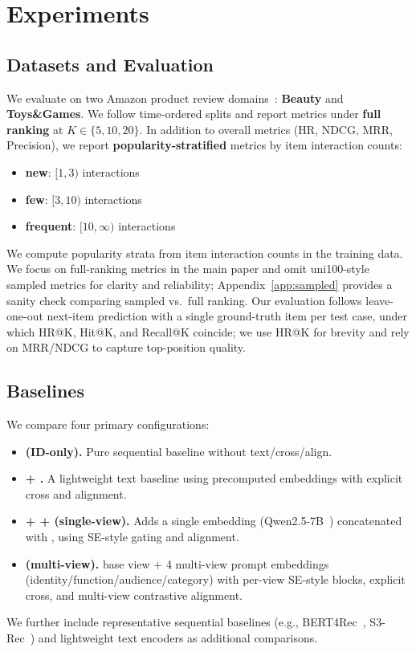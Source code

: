 \section{Experiments}
\subsection{Datasets and Evaluation}
We evaluate on two Amazon product review domains~\cite{mcauley2015amazon,ni2019amazon}: \textbf{Beauty} and
\textbf{Toys\&Games}. We follow time-ordered splits and
report metrics under \textbf{full ranking} at $K\in\{5,10,20\}$.
In addition to overall metrics (HR, NDCG, MRR, Precision),
we report \textbf{popularity-stratified} metrics by item
interaction counts:
\begin{itemize}[leftmargin=*,itemsep=1pt]
  \item \textbf{new}: $[1,3)$ interactions
  \item \textbf{few}: $[3,10)$ interactions
  \item \textbf{frequent}: $[10,\infty)$ interactions
\end{itemize}
We compute popularity strata from item interaction counts in
the training data. We focus on full-ranking metrics in the
main paper and omit uni100-style sampled metrics for clarity
and reliability; Appendix~\ref{app:sampled} provides a sanity
check comparing sampled vs.\ full ranking. Our evaluation
follows leave-one-out next-item prediction with a single
ground-truth item per test case, under which HR@K, Hit@K, and
Recall@K coincide; we use HR@K for brevity and rely on
MRR/NDCG to capture top-position quality.

\subsection{Baselines}
We compare four primary configurations:
\begin{itemize}[leftmargin=*,itemsep=2pt]
  \item \textbf{\base (ID-only).} Pure sequential baseline
    without text/cross/align.
  \item \textbf{\base + \tfidf.} A lightweight text baseline
    using precomputed \tfidf embeddings with explicit cross
    and alignment.
  \item \textbf{\base + \tfidf + \llm (single-view).} Adds a
    single \llm embedding (Qwen2.5-7B~\cite{qwen2024qwen25}) concatenated with
    \tfidf, using SE-style gating and alignment.
  \item \textbf{\model (multi-view).} \tfidf base view + 4
    multi-view \llm prompt embeddings
    (identity/function/audience/category) with per-view SE-style blocks,
    explicit cross, and multi-view contrastive alignment.
\end{itemize}
We further include representative sequential baselines (e.g.,
BERT4Rec~\cite{sun2019bert4rec}, S3-Rec~\cite{zhou2020s3rec})
and lightweight text encoders as additional comparisons.

